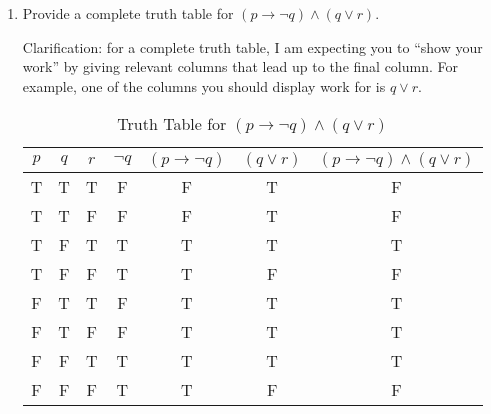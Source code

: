 \documentclass{article}
\begin{document}
\begin{enumerate}
\begin{enumerate}
            \end{enumerate}

            \newpage

      \item Provide a complete truth table for $(p \rightarrow \neg q) \wedge (q \vee r)$.

            Clarification: for a complete truth table, I am expecting you to ``show your work'' by giving relevant columns that lead up to the final column. For example, one of the columns you should display work for is $q \vee r$.

            \begin{table}[h]
                  \centering
                  \begin{tabular}{|c|c|c||c|c|c|c|}
                        \hline
                        $p$ & $q$ & $r$ & $\neg q$ & $(p \rightarrow \neg q)$ & $(q \vee r)$ & $(p \rightarrow \neg q) \wedge (q \vee r)$ \\ \hline
                        T   & T   & T   & F        & F                        & T            & F                                          \\ \hline
                        T   & T   & F   & F        & F                        & T            & F                                          \\ \hline
                        T   & F   & T   & T        & T                        & T            & T                                          \\ \hline
                        T   & F   & F   & T        & T                        & F            & F                                          \\ \hline
                        F   & T   & T   & F        & T                        & T            & T                                          \\ \hline
                        F   & T   & F   & F        & T                        & T            & T                                          \\ \hline
                        F   & F   & T   & T        & T                        & T            & T                                          \\ \hline
                        F   & F   & F   & T        & T                        & F            & F                                          \\ \hline
                  \end{tabular}
                  \caption{Truth Table for $(p \rightarrow \neg q) \wedge (q \vee r)$}
            \end{table}

\end{enumerate}
\end{document}
